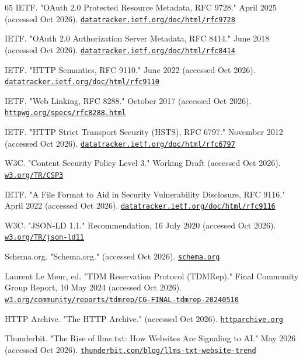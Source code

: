 \documentclass{article}
\begin{document}
\begin{thebibliography}{65}
IETF. "OAuth 2.0 Protected Resource Metadata, RFC 9728." April 2025 (accessed Oct 2026). \href{https://datatracker.ietf.org/doc/html/rfc9728}{\nolinkurl{datatracker.ietf.org/doc/html/rfc9728}}

IETF. "OAuth 2.0 Authorization Server Metadata, RFC 8414." June 2018 (accessed Oct 2026). \href{https://datatracker.ietf.org/doc/html/rfc8414}{\nolinkurl{datatracker.ietf.org/doc/html/rfc8414}}

IETF. "HTTP Semantics, RFC 9110." June 2022 (accessed Oct 2026). \href{https://datatracker.ietf.org/doc/html/rfc9110}{\nolinkurl{datatracker.ietf.org/doc/html/rfc9110}}

IETF. "Web Linking, RFC 8288." October 2017 (accessed Oct 2026). \href{https://httpwg.org/specs/rfc8288.html}{\nolinkurl{httpwg.org/specs/rfc8288.html}}

IETF. "HTTP Strict Transport Security (HSTS), RFC 6797." November 2012 (accessed Oct 2026). \href{https://datatracker.ietf.org/doc/html/rfc6797}{\nolinkurl{datatracker.ietf.org/doc/html/rfc6797}}

W3C. "Content Security Policy Level 3." Working Draft (accessed Oct 2026). \href{https://www.w3.org/TR/CSP3}{\nolinkurl{w3.org/TR/CSP3}}

IETF. "A File Format to Aid in Security Vulnerability Disclosure, RFC 9116." April 2022 (accessed Oct 2026). \href{https://datatracker.ietf.org/doc/html/rfc9116}{\nolinkurl{datatracker.ietf.org/doc/html/rfc9116}}

W3C. "JSON-LD 1.1." Recommendation, 16 July 2020 (accessed Oct 2026). \href{https://www.w3.org/TR/json-ld11}{\nolinkurl{w3.org/TR/json-ld11}}

Schema.org. "Schema.org." (accessed Oct 2026). \href{https://schema.org}{\nolinkurl{schema.org}}

Laurent Le Meur, ed. "TDM Reservation Protocol (TDMRep)." Final Community Group Report, 10 May 2024 (accessed Oct 2026). \href{https://www.w3.org/community/reports/tdmrep/CG-FINAL-tdmrep-20240510/}{\nolinkurl{w3.org/community/reports/tdmrep/CG-FINAL-tdmrep-20240510}}

HTTP Archive. "The HTTP Archive." (accessed Oct 2026). \href{https://httparchive.org}{\nolinkurl{httparchive.org}}

Thunderbit. "The Rise of llms.txt: How Websites Are Signaling to AI." May 2026 (accessed Oct 2026). \href{https://thunderbit.com/blog/llms-txt-website-trend}{\nolinkurl{thunderbit.com/blog/llms-txt-website-trend}}


\end{thebibliography}
\end{document}
